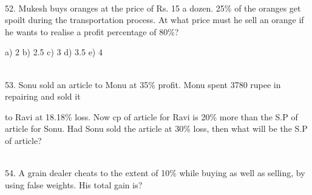 \documentclass{article} %
\begin{document}
\noindent 

\noindent 

\noindent \\  52. Mukesh buys oranges at the price of Rs. 15 a dozen. 25\% of the oranges get spoilt during the transportation process. At what price must he sell an orange if he wants to realise a profit percentage of 80\%?

\noindent a) 2             b) 2.5                c) 3                    d) 3.5                e) 4

\noindent 

\noindent 

\noindent 

\noindent 

\noindent  \\ 53. Sonu sold an article to Monu at 35\% profit. Monu spent 3780 rupee in repairing and sold it

\noindent 

\noindent to Ravi at 18.18\% loss. Now cp of article for Ravi is 20\% more than the S.P of article for Sonu. Had Sonu sold the article at 30\% loss, then what will be the S.P of article?

\noindent 

\noindent 

\noindent \\ 54. A grain dealer cheats to the extent of 10\% while buying as well as selling, by using false weights. His total gain is?



\noindent 
\end{document}
